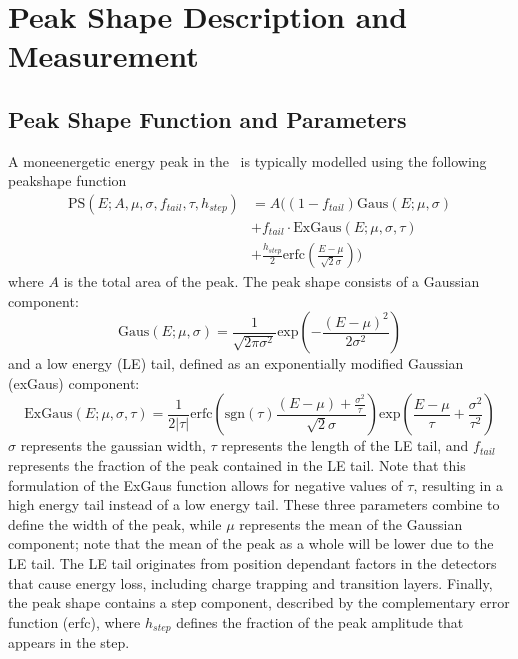 \documentclass[/main.tex]{subfiles}
\begin{document}
\onlyinsubfile{\appendix}
\chapter{Peak Shape Description and Measurement} \label{app:peakshape}

\section{Peak Shape Function and Parameters}
A moneenergetic energy peak in the \MJD\ is typically modelled using the following peakshape function
\begin{equation}
  \begin{aligned}
    \mathrm{PS}(E; A, \mu, \sigma, f_{tail}, \tau, h_{step}) &= A\big((1-f_{tail})\mathrm{Gaus}(E; \mu, \sigma) \\&+ f_{tail}\cdot\mathrm{ExGaus}(E; \mu, \sigma, \tau) \\&+ \frac{h_{step}}{2}\mathrm{erfc}(\frac{E-\mu}{\sqrt{2}\sigma})\big)
  \end{aligned}
\end{equation}
where $A$ is the total area of the peak.
The peak shape consists of a Gaussian component:
\begin{equation}
  \mathrm{Gaus}(E; \mu, \sigma) = \frac{1}{\sqrt{2\pi\sigma^2}}\mathrm{exp}(-\frac{(E-\mu)^2}{2\sigma^2})
\end{equation}
and a low energy (LE) tail, defined as an exponentially modified Gaussian (exGaus) component:
\begin{equation}
  \mathrm{ExGaus}(E; \mu, \sigma, \tau) = \frac{1}{2|\tau|} \mathrm{erfc}(\mathrm{sgn}(\tau)\frac{(E-\mu) + \frac{\sigma^2}{\tau}}{\sqrt{2}\sigma})\mathrm{exp}(\frac{E-\mu}{\tau}+\frac{\sigma^2}{\tau^2})
\end{equation}
$\sigma$ represents the gaussian width, $\tau$ represents the length of the LE tail, and $f_{tail}$ represents the fraction of the peak contained in the LE tail.
Note that this formulation of the ExGaus function allows for negative values of $\tau$, resulting in a high energy tail instead of a low energy tail.
These three parameters combine to define the width of the peak, while $\mu$ represents the mean of the Gaussian component; note that the mean of the peak as a whole will be lower due to the LE tail.
The LE tail originates from position dependant factors in the detectors that cause energy loss, including charge trapping and transition layers.
Finally, the peak shape contains a step component, described by the complementary error function (erfc), where $h_{step}$ defines the fraction of the peak amplitude that appears in the step.
\end{document}
